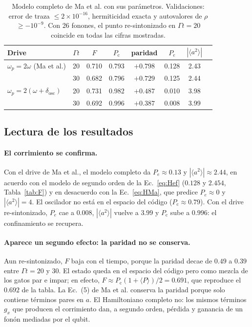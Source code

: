 \documentclass[11pt]{report}
\begin{document}
\begin{table}[h]
\centering
\begin{tabular}{lccccccc}
\toprule
Drive & $\Gamma t$ & $F$ & $P_{\mathrm{c}}$ & paridad & $P_{e}$ & $|\langle a^{2}\rangle|$\\
\midrule
$\omega_{p}=2\omega$ (Ma et al.) & 20 & 0.710 & 0.793 & $+0.798$ & 0.128 & 2.43\\
 & 30 & 0.682 & 0.796 & $+0.729$ & 0.125 & 2.44\\
$\omega_{p}=2(\omega+\delta_{\mathrm{osc}})$ & 20 & 0.731 & 0.982 & $+0.487$ & 0.010 & 3.98\\
 & 30 & 0.692 & 0.996 & $+0.387$ & 0.008 & 3.99\\
\bottomrule
\end{tabular}
\caption{Modelo completo de Ma et al. con sus par\'ametros. Validaciones: error de traza $\leq2\times10^{-16}$, hermiticidad exacta y autovalores de $\rho$ $\geq-10^{-9}$. Con 26 fonones, el punto re-sintonizado en $\Gamma t=20$ coincide en todas las cifras mostradas.}
\label{tab:full}
\end{table}

\subsection{Lectura de los resultados}

\paragraph{El corrimiento se confirma.} Con el drive de Ma et al., el modelo completo da $P_{e}\approx0.13$ y $|\langle a^{2}\rangle|\approx2.44$, en acuerdo con el modelo de segundo orden de la Ec.~\eqref{eq:Hef} ($0.128$ y $2.454$, Tabla~\ref{tab:F}) y en desacuerdo con la Ec.~\eqref{eq:HMa}, que predice $P_{e}\approx0$ y $|\langle a^{2}\rangle|=4$. El oscilador no est\'a en el espacio del c\'odigo ($P_{\mathrm{c}}\approx0.79$). Con el drive re-sintonizado, $P_{e}$ cae a $0.008$, $|\langle a^{2}\rangle|$ vuelve a $3.99$ y $P_{\mathrm{c}}$ sube a $0.996$: el confinamiento se recupera.

\paragraph{Aparece un segundo efecto: la paridad no se conserva.} Aun re-sintonizado, $F$ baja con el tiempo, porque la paridad decae de $0.49$ a $0.39$ entre $\Gamma t=20$ y $30$. El estado queda en el espacio del c\'odigo pero como mezcla de los gatos par e impar; en efecto, $F\approx P_{\mathrm{c}}(1+\langle P\rangle)/2=0.691$, que reproduce el $0.692$ de la tabla. La Ec.~(5) de Ma et al. conserva la paridad porque solo contiene t\'erminos pares en $a$. El Hamiltoniano completo no: los mismos t\'erminos $g_{x}$ que producen el corrimiento dan, a segundo orden, p\'erdida y ganancia de un fon\'on mediadas por el qubit.
\end{document}
